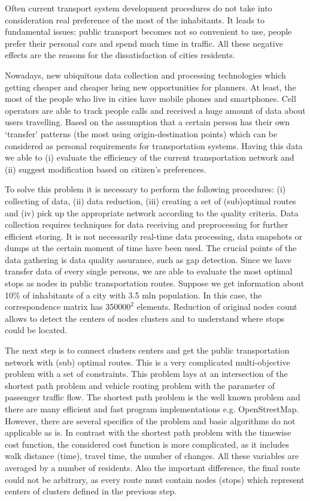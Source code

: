 Often current transport system development procedures do not take into consideration real preference of 
the most of the inhabitants. It leads to fundamental issues: public transport becomes not so convenient 
to use, people prefer their personal cars and spend much time in traffic. All these negative effects are 
the reasons for the dissatisfaction of cities residents. 

Nowadays, new ubiquitous data collection and processing technologies which getting cheaper and cheaper 
bring new opportunities for planners. At least, the most of the people who live in cities have mobile 
phones and smartphones. Cell operators are able to track people calls and received a huge amount of data 
about users travelling. Based on the assumption that a certain person has their own ‘transfer’ patterns 
(the most using origin-destination points) which can be considered as personal requirements for 
transportation systems. Having this data we able to (i) evaluate the efficiency of the current 
transportation network and (ii) suggest modification based on citizen’s preferences. 

To solve this problem it is necessary to perform the following procedures: (i) collecting of data, 
(ii) data reduction, (iii) creating a set of (sub)optimal routes and (iv) pick up the appropriate network 
according to the quality criteria. Data collection requires techniques for data receiving and 
preprocessing for further efficient storing. It is not necessarily real-time data processing, data 
snapshots or dumps at the certain moment of time have been used. The crucial points of the data gathering 
is data quality assurance, such as gap detection. Since we have transfer data of every single persons, 
we are able to evaluate the most optimal stops as nodes in public transportation routes. Suppose we get 
information about 10\% of inhabitants of a city with 3.5 mln population. In this case, the correspondence 
matrix has \( 350 000^2 \) elements. Reduction of original nodes count allows to detect the centers of 
nodes clusters and to understand where stops could be located. 

The next step is to connect clusters centers and get the public transportation network with (sub) 
optimal routes. This is a very complicated multi-objective problem with a set of constraints. This 
problem lays at an intersection of the shortest path problem and vehicle routing problem with the 
parameter of passenger traffic flow. The shortest path problem is the well known problem and there 
are many efficient and fast program implementations e.g. OpenStreetMap. However, there are several 
specifics of the problem and basic algorithms do not applicable as is. In contrast with the shortest 
path problem with the timewise cost function, the considered cost function is more complicated, as it 
includes walk distance (time), travel time, the number of changes. All these variables are averaged by 
a number of residents. Also the important difference, the final route could not be arbitrary, as every 
route must contain nodes (stops) which represent centers of clusters defined in the previous step. 

